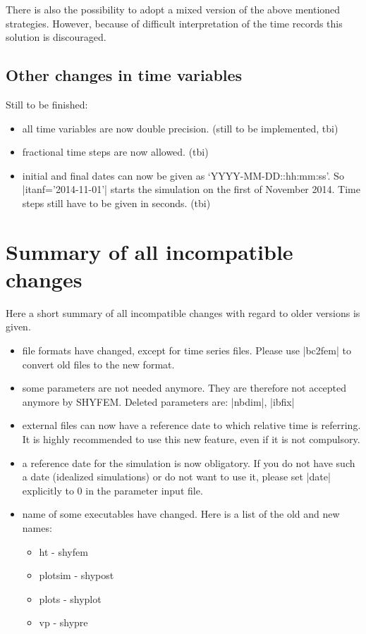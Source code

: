 \documentclass[12pt,draft]{article}
\newcommand{\shyfem}{SHYFEM}
\begin{document}
There is also the possibility to adopt a mixed version of the
above mentioned strategies. However, because of difficult
interpretation of the time records this solution is discouraged.


\subsection{Other changes in time variables}

Still to be finished:
\begin{itemize}
\item all time variables are now double precision. (still to be implemented, tbi)
\item fractional time steps are now allowed. (tbi)
\item initial and final dates can now be given as 
`YYYY-MM-DD::hh:mm:ss'. So |itanf='2014-11-01'| starts the
simulation on the first of November 2014. Time steps still have to
be given in seconds. (tbi)
\end{itemize}



\section{Summary of all incompatible changes}

Here a short summary of all incompatible changes with
regard to older versions is given.

\begin{itemize}
\item file formats have changed, except for time series files. Please use |bc2fem| to convert old files to the new format.
\item some parameters are not needed anymore. They are therefore not accepted anymore by \shyfem. Deleted parameters
are: |nbdim|, |ibfix|
\item external files can now have a reference date to which relative
time is referring. It is highly recommended to use this new feature,
even if it is not compulsory.
\item a reference date for the simulation is now obligatory. If
you do not have such a date (idealized simulations) or do
not want to use it, please set |date| explicitly to 0 in the parameter
input file.
\item name of some executables have changed. Here is a list
of the old and new names:
\begin{itemize}
\item ht - shyfem
\item plotsim - shypost
\item plots - shyplot
\item vp - shypre
\end{itemize}

\end{itemize}
\end{document}
